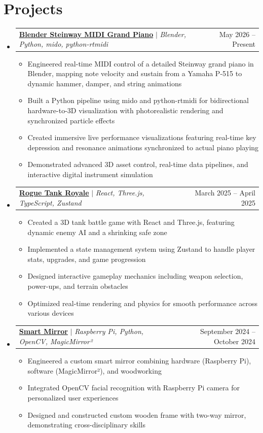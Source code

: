 \documentclass[letterpaper,11pt]{article}
\makeatletter
\newcommand{\resumeItem}[1]{
  \item\small{#1 \vspace{-2pt}}
}
\newcommand{\resumeProjectHeading}[2]{
    \item
    \begin{tabular*}{0.97\textwidth}{l@{\extracolsep{\fill}}r}
      \small#1 & #2 \\
    \end{tabular*}\vspace{-7pt}
}
\newcommand{\resumeSubHeadingListStart}{\begin{itemize}[leftmargin=0.15in, label={}]}
\newcommand{\resumeSubHeadingListEnd}{\end{itemize}}
\newcommand{\resumeItemListStart}{\begin{itemize}[label=$\bullet$]}
\newcommand{\resumeItemListEnd}{\end{itemize}\vspace{-5pt}}
\makeatother
\begin{document}
\section{Projects}
    \resumeSubHeadingListStart
 
      \resumeProjectHeading
          {\textbf{\href{https://github.com/TriMPham98/steinway-blender}{Blender Steinway MIDI Grand Piano}} $|$ \emph{Blender, Python, mido, python-rtmidi}}{May 2026 -- Present}
          \resumeItemListStart
            \resumeItem{Engineered real-time MIDI control of a detailed Steinway grand piano in Blender, mapping note velocity and sustain from a Yamaha P-515 to dynamic hammer, damper, and string animations}
            \resumeItem{Built a Python pipeline using mido and python-rtmidi for bidirectional hardware-to-3D visualization with photorealistic rendering and synchronized particle effects}
            \resumeItem{Created immersive live performance visualizations featuring real-time key depression and resonance animations synchronized to actual piano playing}
            \resumeItem{Demonstrated advanced 3D asset control, real-time data pipelines, and interactive digital instrument simulation}
          \resumeItemListEnd
      \resumeProjectHeading
          {\textbf{\href{https://github.com/TriMPham98/Rogue-Tank-Royale}{Rogue Tank Royale}} $|$ \emph{React, Three.js, TypeScript, Zustand}}{March 2025 -- April 2025}
          \resumeItemListStart
            \resumeItem{Created a 3D tank battle game with React and Three.js, featuring dynamic enemy AI and a shrinking safe zone}
            \resumeItem{Implemented a state management system using Zustand to handle player stats, upgrades, and game progression}
            \resumeItem{Designed interactive gameplay mechanics including weapon selection, power-ups, and terrain obstacles}
            \resumeItem{Optimized real-time rendering and physics for smooth performance across various devices}
          \resumeItemListEnd
      \resumeProjectHeading
          {\textbf{\href{https://github.com/TriMPham98/MagicMirror}{Smart Mirror}} $|$ \emph{Raspberry Pi, Python, OpenCV, MagicMirror²}}{September 2024 -- October 2024}
          \resumeItemListStart
              \resumeItem{Engineered a custom smart mirror combining hardware (Raspberry Pi), software (MagicMirror²), and woodworking}
              \resumeItem{Integrated OpenCV facial recognition with Raspberry Pi camera for personalized user experiences}
              \resumeItem{Designed and constructed custom wooden frame with two-way mirror, demonstrating cross-disciplinary skills}
          \resumeItemListEnd
    \resumeSubHeadingListEnd
\end{document}
